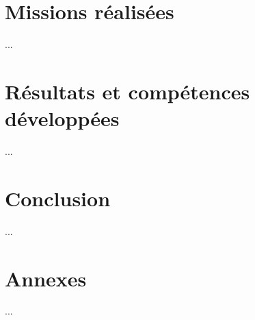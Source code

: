 \documentclass[12pt,a4paper]{report}
\begin{document}
\chapter{Missions réalisées}
... %

\chapter{Résultats et compétences développées}
... %

\chapter{Conclusion}
... %

\appendix
\chapter{Annexes}
... %
\end{document}
